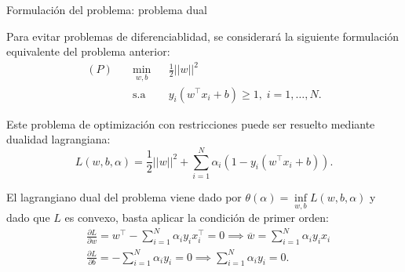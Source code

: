 \documentclass[handout, 9pt]{beamer}
\begin{document}
\begin{frame}{Formulación del problema: problema dual}

Para evitar problemas de diferenciablidad, se considerará la siguiente formulación equivalente del problema anterior:
\begin{equation*}
\begin{aligned}
(P)\quad & \underset{w,b}{\min}
& & \frac{1}{2}||w||^2\\
& \text{s.a}
& & y_i (w^\top x_i +b) \geq 1, \; i = 1, \ldots, N.
\end{aligned}
\end{equation*}\pause

Este problema de optimización con restricciones puede ser resuelto mediante dualidad lagrangiana:
\begin{equation*}
    L(w,b,\alpha) = \frac{1}{2}||w||^2 + \sum\limits_{i=1}^{N} \alpha_i \left(1-y_i (w^\top x_i +b)\right).
\end{equation*}\pause
	
El lagrangiano dual del problema viene dado por $\theta(\alpha) = \inf\limits_{w,b} L(w,b,\alpha)$ y dado que $L$ es convexo, basta aplicar la condición de primer orden:
\begin{align*}
	&\frac{\partial L}{\partial w} = w^\top - \sum_{i=1}^N \alpha_i y_i x_i^\top = 0 \implies \overline{w} = \sum_{i=1}^N \alpha_i y_i x_i\\
	&\frac{\partial L}{\partial b} = -\sum_{i=1}^N \alpha_i y_i = 0 \implies \sum_{i=1}^N \alpha_i y_i = 0.
\end{align*}

	
\end{frame}
\end{document}
